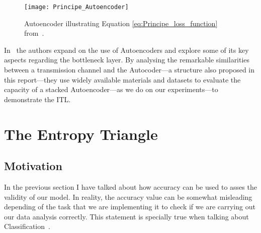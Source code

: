 \begin{figure}[H]
	\centering	
	\texttt{[image: Principe\_Autoencoder]}
	\caption{Autoencoder illustrating Equation \ref{eq:Principe_loss_function} from~\protect\cite{Santana_2016}.}
	\label{fig:figure_autoencoder2}
\end{figure} 

In~\cite{Yu_2019} the authors expand on the use of Autoencoders and explore some of its key aspects regarding the bottleneck layer. By analysing the remarkable similarities between a transmission channel and the Autocoder---a structure also proposed in this report---they use widely available materials and datasets to evaluate the capacity of a stacked Autoencoder---as we do on our experiments---to demonstrate the ITL. 


\section{The Entropy Triangle}
\subsection{Motivation}

In the previous section I have talked about how accuracy can be used to asses the validity of our model. In reality, the accuracy value can be somewhat misleading depending of the task that we are implementing it to check if we are carrying out our data analysis correctly. This statement is specially true when talking about Classification~\cite{val:pel:14a}.\par

